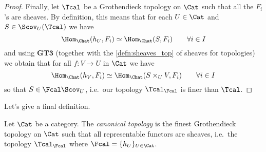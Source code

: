 \documentclass[a4paper]{article}
\begin{document}
\begin{proof}
             Finally, let $\Tcal$ be a Grothendieck topology on $\Cat$ such that all the $F_i$'s are sheaves. By definition, this means that for each $U \in \Cat$ and $S \in \Scov_U(\Tcal)$ we have \[\Hom_{\Chat}(h_U, F_i) \simeq \Hom_{\Chat}(S, F_i) \qquad \forall i \in I \] and using $\mathbf{GT3}$ (together with the \cref{defn:sheaves_top} of sheaves for topologies) we obtain that for all $f\colon V \to U$ in $\Cat$ we have \[\Hom_{\Chat}(h_V, F_i) \simeq \Hom_{\Chat}(S \times_U V, F_i) \qquad \forall i \in I \] so that $S \in \Fcal\Scov_U$, i.e.\ our topology $\Tcal_{\Fcal}$ is finer than $\Tcal$.
         \end{proof}
         Let's give a final definition.
         \begin{defn}
             Let $\Cat$ be a category. The \emph{canonical topology} is the finest Grothendieck topology on $\Cat$ such that all representable functors are sheaves, i.e.\ the topology $\Tcal_{\Fcal}$ where $\Fcal = \{h_U\}_{U \in \Cat}$.
         \end{defn}
\end{document}
